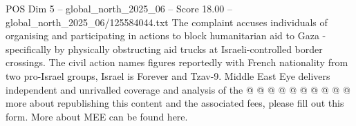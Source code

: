 \begin{textsample}{POS Dim 5 – global\_north\_2025\_06 – Score 18.00 – global\_north\_2025\_06/125584044.txt}
The complaint accuses individuals of organising and participating in actions to block humanitarian aid to Gaza - specifically by physically obstructing aid trucks at Israeli-controlled border crossings.
The civil action names figures reportedly with French nationality from two pro-Israel groups, Israel is Forever and Tzav-9.
Middle East Eye delivers independent and unrivalled coverage and analysis of the @ @ @ @ @ @ @ @ @ @ more about republishing this content and the associated fees, please fill out this form.
More about MEE can be found here.

\end{textsample}
